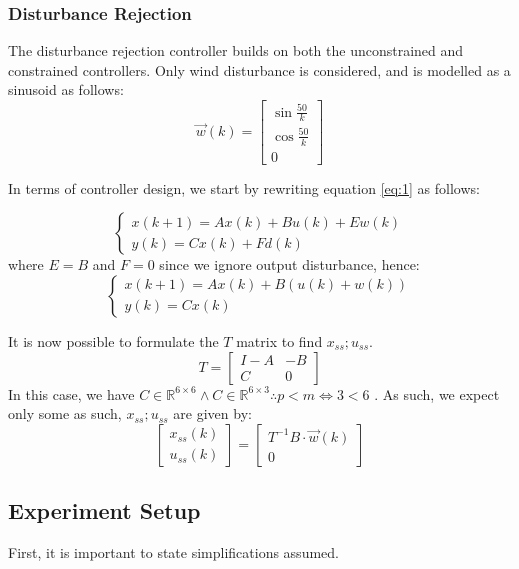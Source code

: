 \documentclass[conference, tikz]{IEEEtran}
\begin{document}
\subsubsection{Disturbance Rejection}
The disturbance rejection controller builds on both the unconstrained and constrained controllers. 
Only wind disturbance is considered, and is modelled as a sinusoid as follows:
\[
    \vec{w}(k)
    =
    \begin{bmatrix}
        \sin{\frac{50}{k}}\\
        \cos{\frac{50}{k}}\\
        0
    \end{bmatrix}
\]

In terms of controller design, we start by rewriting equation \ref{eq:1} as follows:

\[
    \begin{cases}
    x(k+1) = Ax(k) + Bu(k) + Ew(k)\\
    y(k) = Cx(k) + Fd(k)
    \end{cases}
\]
where $E = B$ and $F=0$ since we ignore output disturbance, hence:
\[
    \begin{cases}
        x(k+1) = Ax(k) + B(u(k) + w(k))\\
        y(k) = Cx(k)
    \end{cases}
\]

It is now possible to formulate the $T$ matrix to find $x_{ss};u_{ss}$.
\[
    T = 
    \begin{bmatrix}
        I-A & -B\\
        C & 0
    \end{bmatrix}
\]
In this case, we have $C \in \mathbb{R}^{6 \times 6} \land C \in \mathbb{R}^{6 \times 3} \therefore p < m \iff 3 < 6$ . 
As such, we expect only some 
as such, $x_{ss};u_{ss}$ are given by:
\[
    \begin{bmatrix}
        x_{ss}(k)\\
        u_{ss}(k)
    \end{bmatrix}
    =
    \begin{bmatrix}
        T^{-1}B\cdot \vec w(k)\\

        0
    \end{bmatrix}
    
\]


\subsection{Experiment Setup}
First, it is important to state simplifications assumed. 
\end{document}

